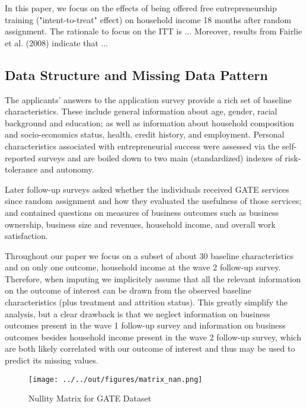 In this paper, we focus on the effects of being offered free entrepreneurship training ("intent-to-treat" effect) on household income 18 months after random assignment. %
The rationale to focus on the ITT is ... %
Moreover, results from Fairlie et al. (2008) indicate that ... %

\subsection{Data Structure and Missing Data Pattern}

The applicants' answers to the application survey provide a rich set of baseline characteristics. These include general information about age, gender, racial background and education; as well as information about household composition and socio-economics status, health, credit history, and employment. Personal characteristics associated with entrepreneurial success were assessed via the self-reported surveys and are boiled down to two main (standardized) indexes of risk-tolerance and autonomy.

Later follow-up surveys asked whether the individuals received GATE services since random assignment and how they evaluated the usefulness of those services; and contained questions on measures of business outcomes such as business ownership, business size and revenues, household income, and overall work satisfaction.

Throughout our paper we focus on a subset of about 30 baseline characteristics and on only one outcome, household income at the wave 2 follow-up survey. Therefore, when imputing we implicitely assume that all the relevant information on the outcome of interest can be drawn from the observed baseline characteristics (plus treatment and attrition status). This greatly simplify the analysis, but a clear drawback is that we neglect information on business outcomes present in the wave 1 follow-up survey and information on business outcomes besides household income present in the wave 2 follow-up survey, which are both likely correlated with our outcome of interest and thus may be used to predict its missing values.


\begin{figure}
    \caption{Nullity Matrix for GATE Dataset}
    \texttt{[image: ../../out/figures/matrix\_nan.png]}
    \label{fig:matrix_nan}
\end{figure}

